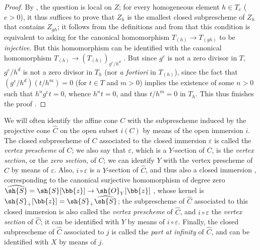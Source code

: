 \begin{proof}
By , the question is local on $Z$;
for every homogeneous element $h\in T_e$ ($e>0$), it thus suffices to prove that $Z_h$ is the smallest closed subprescheme of $Z_h$ that contains $Z_{gh}$;
it follows from the definitions and from  that this condition is equivalent to asking for the canonical homomorphism $T_{(h)}\to T_{(gh)}$ to be \emph{injective}.
But this homomorphism can be identified with the canonical homomorphism $T_{(h)}\to(T_{(h)})_{g^e/h^d}$ .
But since $g^e$ is not a zero divisor in $T$, $g^e/h^d$ is not a zero divisor in $T_h$ (nor \emph{a fortiori} in $T_{(h)}$), since the fact that $(g^e/h^d)(t/h^m)=0$ (for $t\in T$ and $m>0$) implies the existence of some $n>0$ such that $h^ng^et=0$, whence $h^nt=0$, and thus $t/h^m=0$ in $T_h$.
This thus finishes the proof .
\end{proof}

\begin{env}[8.3.3]
\label{II.8.3.3}
We will often identify the affine cone $C$ with the subprescheme induced by the projective cone $\widehat{C}$ on the open subset $i(C)$ by means of the open immersion $i$.
The closed subprescheme of $C$ associated to the closed immersion $\varepsilon$ is called the \emph{vertex prescheme} of $C$;
we also say that $\varepsilon$, which is a $Y$-section of $C$, is the \emph{vertex section}, or the \emph{zero section}, of $C$;
we can identify $Y$ with the vertex prescheme of $C$ by means of $\varepsilon$.
Also, $i\circ\varepsilon$ is a $Y$-section of $\widehat{C}$, and thus also a closed immersion , corresponding to the canonical surjective homomorphism of degree zero $\widehat{\sh{S}} = \sh{S}[\bb{z}] \to \sh{O}_Y[\bb{z}]$ , whose kernel is $\sh{S}_+[\bb{z}] = \sh{S}_+\widehat{\sh{S}}$;
the subprescheme of $\widehat{C}$ associated to this closed immersion is also called the \emph{vertex prescheme} of $\widehat{C}$, and $i\circ\varepsilon$ the \emph{vertex section} of $\widehat{C}$;
it can be identified with $Y$ by means of $i\circ\varepsilon$.
Finally, the closed subprescheme of $\widehat{C}$ associated to $j$ is called the \emph{part at infinity} of $\widehat{C}$, and can be identified with $X$ by means of $j$.
\end{env}

